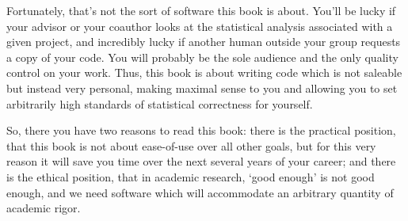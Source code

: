 Fortunately, that's not the sort of software this book is about.
You'll be lucky if your advisor or your coauthor looks at the statistical
analysis associated with a given project, and incredibly lucky if another
human outside your group requests a copy of your code. You will probably
be the sole audience and the only quality control on your work. Thus,
this book is about writing code which is not saleable but instead very
personal, making maximal sense to you and allowing you to set arbitrarily
high standards of statistical correctness for yourself.

So, there you have two reasons to read this book: there is the practical
position, that this book is not about ease-of-use over all other goals,
but for this very reason it will save you time over the next several
years of your career; and there is the ethical position, that in academic
research, `good enough' is not good enough, and we need software which
will accommodate an arbitrary quantity of academic rigor.

